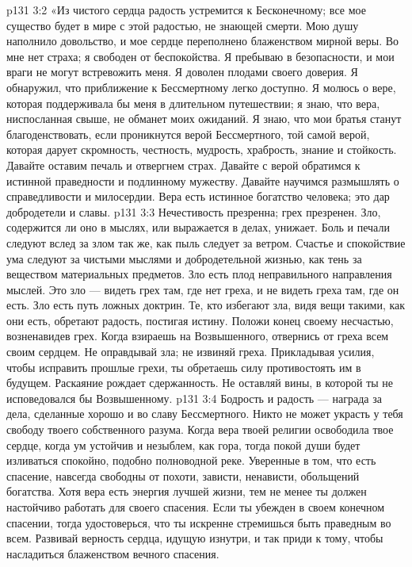 \vs p131 3:2 \pc «Из чистого сердца радость устремится к Бесконечному; все мое существо будет в мире с этой радостью, не знающей смерти. Мою душу наполнило довольство, и мое сердце переполнено блаженством мирной веры. Во мне нет страха; я свободен от беспокойства. Я пребываю в безопасности, и мои враги не могут встревожить меня. Я доволен плодами своего доверия. Я обнаружил, что приближение к Бессмертному легко доступно. Я молюсь о вере, которая поддерживала бы меня в длительном путешествии; я знаю, что вера, ниспосланная свыше, не обманет моих ожиданий. Я знаю, что мои братья станут благоденствовать, если проникнутся верой Бессмертного, той самой верой, которая дарует скромность, честность, мудрость, храбрость, знание и стойкость. Давайте оставим печаль и отвергнем страх. Давайте с верой обратимся к истинной праведности и подлинному мужеству. Давайте научимся размышлять о справедливости и милосердии. Вера есть истинное богатство человека; это дар добродетели и славы.
\vs p131 3:3 Нечестивость презренна; грех презренен. Зло, содержится ли оно в мыслях, или выражается в делах, унижает. Боль и печали следуют вслед за злом так же, как пыль следует за ветром. Счастье и спокойствие ума следуют за чистыми мыслями и добродетельной жизнью, как тень за веществом материальных предметов. Зло есть плод неправильного направления мыслей. Это зло --- видеть грех там, где нет греха, и не видеть греха там, где он есть. Зло есть путь ложных доктрин. Те, кто избегают зла, видя вещи такими, как они есть, обретают радость, постигая истину. Положи конец своему несчастью, возненавидев грех. Когда взираешь на Возвышенного, отвернись от греха всем своим сердцем. Не оправдывай зла; не извиняй греха. Прикладывая усилия, чтобы исправить прошлые грехи, ты обретаешь силу противостоять им в будущем. Раскаяние рождает сдержанность. Не оставляй вины, в которой ты не исповедовался бы Возвышенному.
\vs p131 3:4 Бодрость и радость --- награда за дела, сделанные хорошо и во славу Бессмертного. Никто не может украсть у тебя свободу твоего собственного разума. Когда вера твоей религии освободила твое сердце, когда ум устойчив и незыблем, как гора, тогда покой души будет изливаться спокойно, подобно полноводной реке. Уверенные в том, что есть спасение, навсегда свободны от похоти, зависти, ненависти, обольщений богатства. Хотя вера есть энергия лучшей жизни, тем не менее ты должен настойчиво работать для своего спасения. Если ты убежден в своем конечном спасении, тогда удостоверься, что ты искренне стремишься быть праведным во всем. Развивай верность сердца, идущую изнутри, и так приди к тому, чтобы насладиться блаженством вечного спасения.
